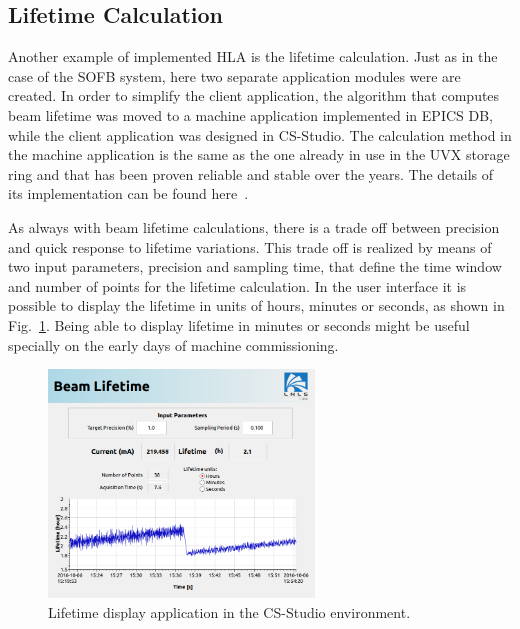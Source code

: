 \subsection{Lifetime Calculation}

Another example of implemented HLA is the lifetime calculation. Just as in the case of the SOFB system, here two separate application modules were are created. In order to simplify the client application, the algorithm that computes beam lifetime was moved to a machine application implemented in EPICS DB, while the client application was designed in CS-Studio. The calculation method in the machine application is the same as the one already in use in the UVX storage ring and that has been proven reliable and stable over the years. The details of its implementation can be found here~\cite{lifetime}.

As always with beam lifetime calculations, there is a trade off between precision and quick response to lifetime variations. This trade off is realized by means of two input parameters, precision and sampling time, that define the time window and number of points for the lifetime calculation. In the user interface it is possible to display the lifetime in units of hours, minutes or seconds, as shown in Fig.~\ref{fig:lifetimef1}. Being able to display lifetime in minutes or seconds might be useful specially on the early days of machine commissioning.

\begin{figure}[!htb]
   \centering
   \includegraphics*[width=200pt]{WEPOPRPO22f2}
   \caption{Lifetime display application in the CS-Studio environment.}
   \label{fig:lifetimef1}
\end{figure}